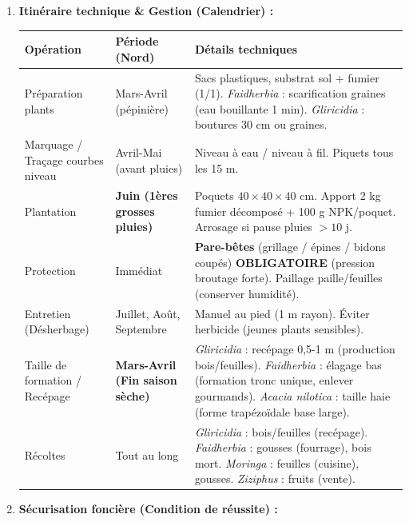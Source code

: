 \documentclass[11pt]{article}
\begin{document}
\begin{exoresolu}
\begin{enumerate}
\begin{itemize}
            \item \textbf{Bas-fonds / Zones humides (si existant) :} \emph{Acacia seyal} / \emph{Mitragyna inermis} (stabilisation berges, nectar apicole).
        \end{itemize}
        \item \textbf{Itinéraire technique \& Gestion (Calendrier) :}
        \begin{center}
            \begin{tabularx}{\linewidth}{|l|X|X|}\hline
            \rowcolor{popblueL}
            \textbf{Opération} & \textbf{Période (Nord)} & \textbf{Détails techniques} \\ \hline
            Préparation plants & Mars-Avril (pépinière) & Sacs plastiques, substrat sol + fumier (1/1). \emph{Faidherbia} : scarification graines (eau bouillante 1 min). \emph{Gliricidia} : boutures 30 cm ou graines. \\ \hline
            Marquage / Traçage courbes niveau & Avril-Mai (avant pluies) & Niveau à eau / niveau à fil. Piquets tous les 15 m. \\ \hline
            Plantation & \textbf{Juin (1ères grosses pluies)} & Poquets $40 \times 40 \times 40$ cm. Apport 2 kg fumier décomposé + 100 g NPK/poquet. Arrosage si pause pluies $> 10$ j. \\ \hline
            Protection & Immédiat & \textbf{Pare-bêtes} (grillage / épines / bidons coupés) \textbf{OBLIGATOIRE} (pression broutage forte). Paillage paille/feuilles (conserver humidité). \\ \hline
            Entretien (Désherbage) & Juillet, Août, Septembre & Manuel au pied (1 m rayon). Éviter herbicide (jeunes plants sensibles). \\ \hline
            Taille de formation / Recépage & \textbf{Mars-Avril (Fin saison sèche)} & \emph{Gliricidia} : recépage 0,5-1 m (production bois/feuilles). \emph{Faidherbia} : élagage bas (formation tronc unique, enlever gourmands). \emph{Acacia nilotica} : taille haie (forme trapézoïdale base large). \\ \hline
            Récoltes & Tout au long & \emph{Gliricidia} : bois/feuilles (recépage). \emph{Faidherbia} : gousses (fourrage), bois mort. \emph{Moringa} : feuilles (cuisine), gousses. \emph{Ziziphus} : fruits (vente). \\ \hline
        \end{tabularx}
    \end{center}
        \item \textbf{Sécurisation foncière (Condition de réussite) :}

\end{enumerate}
\end{exoresolu}
\end{document}
